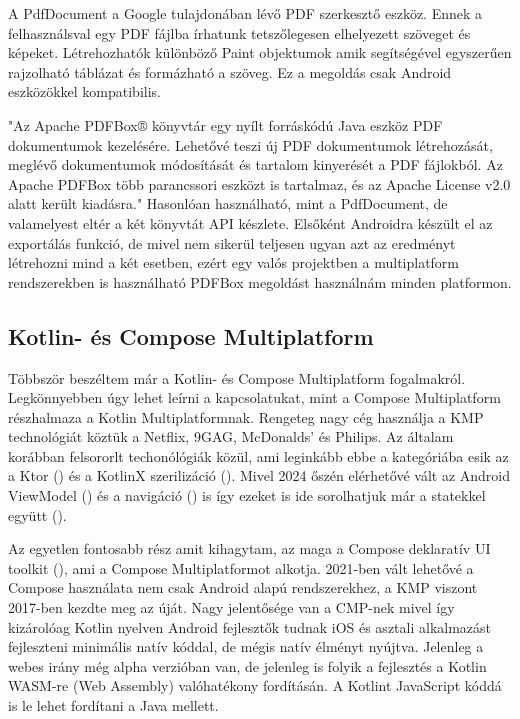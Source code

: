 A PdfDocument a Google tulajdonában lévő PDF szerkesztő eszköz. Ennek a felhasználsval egy PDF fájlba írhatunk tetszőlegesen elhelyezett szöveget és képeket.
Létrehozhatók különböző Paint objektumok amik segítségével egyszerűen rajzolható táblázat és formázható a szöveg. Ez a megoldás csak Android eszközökkel kompatibilis. 

"Az Apache PDFBox® könyvtár egy nyílt forráskódú Java eszköz PDF dokumentumok kezelésére. Lehetővé teszi új PDF dokumentumok létrehozását, meglévő dokumentumok módosítását és tartalom kinyerését a PDF fájlokból. Az Apache PDFBox több parancssori eszközt is tartalmaz, és az Apache License v2.0 alatt került kiadásra." \cite{PDFbox}
Hasonlóan használható, mint a PdfDocument, de valamelyest eltér a két könyvtát API készlete. Elsőként Androidra készült el az exportálás funkció, de mivel nem sikerül teljesen ugyan azt az eredményt létrehozni mind a két esetben, ezért egy valós projektben a multiplatform rendszerekben is használható PDFBox megoldást használnám minden platformon. 

\subsection{Kotlin- és Compose Multiplatform}
\label{sec:KCMP}

Többször beszéltem már a Kotlin- és Compose Multiplatform fogalmakról.
Legkönnyebben úgy lehet leírni a kapcsolatukat, mint a Compose Multiplatform részhalmaza a Kotlin Multiplatformnak.
Rengeteg nagy cég használja a KMP technológiát köztük a Netflix, 9GAG, McDonalds' és Philips. \cite{KotlinMultiplatformStable}
Az általam korábban felsororlt techonólógiák közül, ami leginkább ebbe a kategóriába esik az a Ktor () és a KotlinX szerilizáció ().
Mivel 2024 őszén elérhetővé vált az Android ViewModel () és a navigáció () is így ezeket is ide sorolhatjuk már a statekkel együtt ().

Az egyetlen fontosabb rész amit kihagytam, az maga a Compose deklaratív UI toolkit (), ami a Compose Multiplatformot alkotja.
2021-ben vált lehetővé a Compose használata nem csak Android alapú rendszerekhez, a KMP viszont 2017-ben kezdte meg az úját.
Nagy jelentősége van a CMP-nek mivel így kizárolóag Kotlin nyelven Android fejlesztők tudnak iOS és asztali alkalmazást fejleszteni minimális natív kóddal, de mégis natív élményt nyújtva.
Jelenleg a webes irány még alpha verzióban van, de jelenleg is folyik a fejlesztés a Kotlin WASM-re (Web Assembly) valóhatékony fordításán. A Kotlint JavaScript kóddá is le lehet fordítani a Java mellett.


